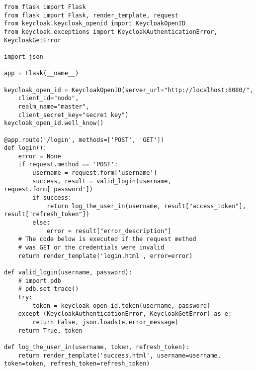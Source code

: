 \lstset{language=Python}
\lstset{frame=lines}
\lstset{basicstyle=\footnotesize}
\begin{lstlisting}
from flask import Flask
from flask import Flask, render_template, request
from keycloak.keycloak_openid import KeycloakOpenID
from keycloak.exceptions import KeycloakAuthenticationError, KeycloakGetError

import json

app = Flask(__name__)

keycloak_open_id = KeycloakOpenID(server_url="http://localhost:8080/", 
	client_id="nodo", 
	realm_name="master", 
	client_secret_key="secret key")
keycloak_open_id.well_know()

@app.route('/login', methods=['POST', 'GET'])
def login():
	error = None
	if request.method == 'POST':
		username = request.form['username']
		success, result = valid_login(username, request.form['password'])
		if success:
			return log_the_user_in(username, result["access_token"], result["refresh_token"])
		else:
			error = result["error_description"]
	# The code below is executed if the request method
	# was GET or the credentials were invalid
	return render_template('login.html', error=error)

def valid_login(username, password):
	# import pdb
	# pdb.set_trace()
	try:
		token = keycloak_open_id.token(username, password)
	except (KeycloakAuthenticationError, KeycloakGetError) as e:
		return False, json.loads(e.error_message)
	return True, token

def log_the_user_in(username, token, refresh_token):
	return render_template('success.html', username=username, token=token, refresh_token=refresh_token)
\end{lstlisting}
